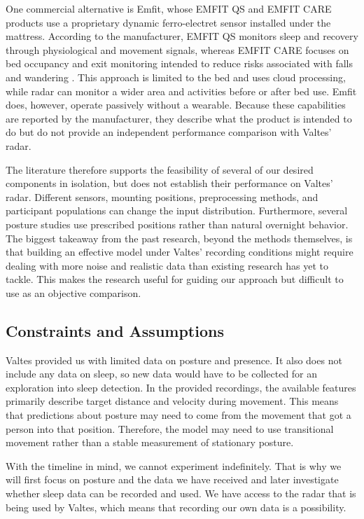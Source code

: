One commercial alternative is Emfit, whose EMFIT QS and EMFIT CARE products use a proprietary dynamic ferro-electret sensor installed under the mattress. According to the manufacturer, EMFIT QS monitors sleep and recovery through physiological and movement signals, whereas EMFIT CARE focuses on bed occupancy and exit monitoring intended to reduce risks associated with falls and wandering \cite{emfit2026monitoring,emfit2026specifications}. This approach is limited to the bed and uses cloud processing, while radar can monitor a wider area and activities before or after bed use. Emfit does, however, operate passively without a wearable. Because these capabilities are reported by the manufacturer, they describe what the product is intended to do but do not provide an independent performance comparison with Valtes' radar.

The literature therefore supports the feasibility of several of our desired components in isolation, but does not establish their performance on Valtes' radar. Different sensors, mounting positions, preprocessing methods, and participant populations can change the input distribution. Furthermore, several posture studies use prescribed positions rather than natural overnight behavior. The biggest takeaway from the past research, beyond the methods themselves, is that building an effective model under Valtes' recording conditions might require dealing with more noise and realistic data than existing research has yet to tackle. This makes the research useful for guiding our approach but difficult to use as an objective comparison.

\subsection{Constraints and Assumptions}
Valtes provided us with limited data on posture and presence. It also does not include any data on sleep, so new data would have to be collected for an exploration into sleep detection. In the provided recordings, the available features primarily describe target distance and velocity during movement. This means that predictions about posture may need to come from the movement that got a person into that position. Therefore, the model may need to use transitional movement rather than a stable measurement of stationary posture.

With the timeline in mind, we cannot experiment indefinitely. That is why we will first focus on posture and the data we have received and later investigate whether sleep data can be recorded and used. We have access to the radar that is being used by Valtes, which means that recording our own data is a possibility.

